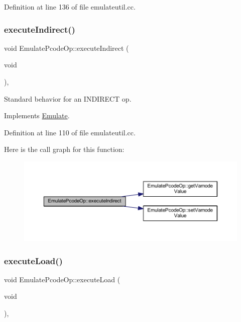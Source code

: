 Definition at line 136 of file emulateutil.\+cc.

\mbox{\label{class_emulate_pcode_op_ab092522c4b63f02b633dbeb98d9ecaba}} 
\subsubsection{\texorpdfstring{executeIndirect()}{executeIndirect()}}
{\footnotesize\ttfamily void Emulate\+Pcode\+Op\+::execute\+Indirect (\begin{DoxyParamCaption}\item[{void}]{ }\end{DoxyParamCaption})\hspace{0.3cm}{\ttfamily [protected]}, {\ttfamily [virtual]}}



Standard behavior for an I\+N\+D\+I\+R\+E\+CT op. 



Implements \mbox{\hyperlink{class_emulate_aa791523787e5154d73bfe0e846a2cd38}{Emulate}}.



Definition at line 110 of file emulateutil.\+cc.

Here is the call graph for this function\+:
\nopagebreak
\begin{figure}[H]
\begin{center}
\leavevmode
\includegraphics[width=350pt]{class_emulate_pcode_op_ab092522c4b63f02b633dbeb98d9ecaba_cgraph}
\end{center}
\end{figure}
\mbox{\label{class_emulate_pcode_op_ab665b04ab8db4b7025e1a5b6a05189ea}} 
\subsubsection{\texorpdfstring{executeLoad()}{executeLoad()}}
{\footnotesize\ttfamily void Emulate\+Pcode\+Op\+::execute\+Load (\begin{DoxyParamCaption}\item[{void}]{ }\end{DoxyParamCaption})\hspace{0.3cm}{\ttfamily [protected]}, {\ttfamily [virtual]}}



